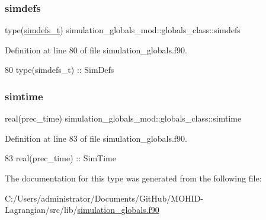 \subsubsection{\texorpdfstring{simdefs}{simdefs}}
{\footnotesize\ttfamily type(\mbox{\hyperlink{structsimulation__globals__mod_1_1simdefs__t}{simdefs\+\_\+t}}) simulation\+\_\+globals\+\_\+mod\+::globals\+\_\+class\+::simdefs\hspace{0.3cm}{\ttfamily [private]}}



Definition at line 80 of file simulation\+\_\+globals.\+f90.


\begin{DoxyCode}
80         \textcolor{keywordtype}{type}(simdefs\_t)     :: SimDefs
\end{DoxyCode}
\mbox{\label{structsimulation__globals__mod_1_1globals__class_ab28ea8e0cca87c11a33e4acfb3d3b293}} 
\subsubsection{\texorpdfstring{simtime}{simtime}}
{\footnotesize\ttfamily real(prec\+\_\+time) simulation\+\_\+globals\+\_\+mod\+::globals\+\_\+class\+::simtime\hspace{0.3cm}{\ttfamily [private]}}



Definition at line 83 of file simulation\+\_\+globals.\+f90.


\begin{DoxyCode}
83         \textcolor{keywordtype}{real(prec\_time)}     :: SimTime
\end{DoxyCode}


The documentation for this type was generated from the following file\+:\begin{DoxyCompactItemize}
\item 
C\+:/\+Users/administrator/\+Documents/\+Git\+Hub/\+M\+O\+H\+I\+D-\/\+Lagrangian/src/lib/\mbox{\hyperlink{simulation__globals_8f90}{simulation\+\_\+globals.\+f90}}\end{DoxyCompactItemize}
